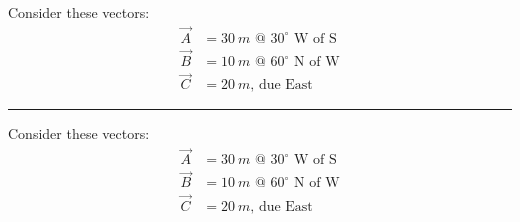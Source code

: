 \documentclass[12pt]{exam}
\begin{document}
\Large
  
\noindent
  Consider these vectors:
  \begin{align*}
    \vec{A} &= \SI{30}{m} \text{ @ $30^\circ$ W of S} \\
    \vec{B} &= \SI{10}{m} \text{ @ $60^\circ$ N of W} \\
    \vec{C} &= \SI{20}{m} \text{, due East}
  \end{align*}



  \vs \hrule \vs


\noindent
  Consider these vectors:
  \begin{align*}
    \vec{A} &= \SI{30}{m} \text{ @ $30^\circ$ W of S} \\
    \vec{B} &= \SI{10}{m} \text{ @ $60^\circ$ N of W} \\
    \vec{C} &= \SI{20}{m} \text{, due East}
  \end{align*}
\end{document}
